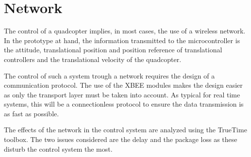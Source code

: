 \chapter{Network} \label{ch:Network}

The control of a quadcopter implies, in most cases, the use of a wireless network. In the prototype at hand, the information transmitted to the microcontroller is the attitude, translational position and position reference of translational controllers and the translational velocity of the quadcopter.

The control of such a system trough a network requires the design of a communication protocol. The use of the XBEE modules makes the design easier as only the transport layer must be taken into account. As typical for real time systems, this will be a connectionless protocol to ensure the data transmission is as fast as possible.

The effects of the network in the control system are analyzed using the TrueTime toolbox. The two issues considered are the delay and the package loss as these disturb the control system the most.
